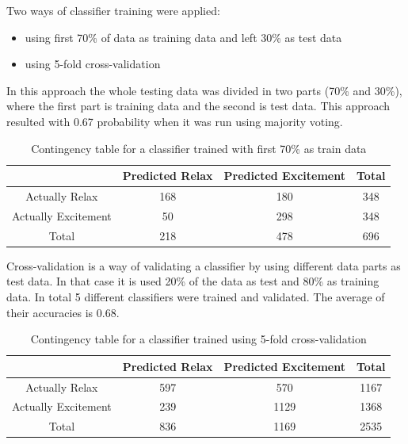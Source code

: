 \documentclass[12pt]{article}
\begin{document}
Two ways of classifier training were applied:
\begin{itemize}
\item using first 70\% of data as training data and left 30\% as test data
\item using 5-fold cross-validation
\end{itemize}

In this approach the whole testing data was divided in two parts (70\% and 30\%), where the first part is training data and the second is test data.
This approach resulted with 0.67 probability when it was run using majority voting.

\begin{table}[H]
\caption{Contingency table for a classifier trained with first 70\% as train data} \label{tab:title} 
\begin{center}
  \begin{tabular}{ | c | c | c | c | }
    \hline
     & Predicted Relax & Predicted Excitement & Total \\ \hline
    Actually Relax & 168 & 180 & 348 \\ \hline
    Actually Excitement & 50 & 298 & 348 \\ \hline
    Total & 218 & 478 & 696 \\ 
    \hline
  \end{tabular}
\end{center}
\end{table}

Cross-validation is a way of validating a classifier by using different data parts as test data. In that case it is used 20\% of the data as test and 80\% as training data. In total 5 different classifiers were trained and validated. The average of their accuracies is 0.68.

\begin{table}[H]
\caption{Contingency table for a classifier trained using 5-fold cross-validation} \label{tab:title} 
\begin{center}
  \begin{tabular}{ | c | c | c | c | }
    \hline
     & Predicted Relax & Predicted Excitement & Total \\ \hline
    Actually Relax & 597 & 570 & 1167 \\ \hline
    Actually Excitement & 239 & 1129 & 1368 \\ \hline
    Total & 836 & 1169 & 2535 \\ 
    \hline
  \end{tabular}
\end{center}
\end{table}
\end{document}
